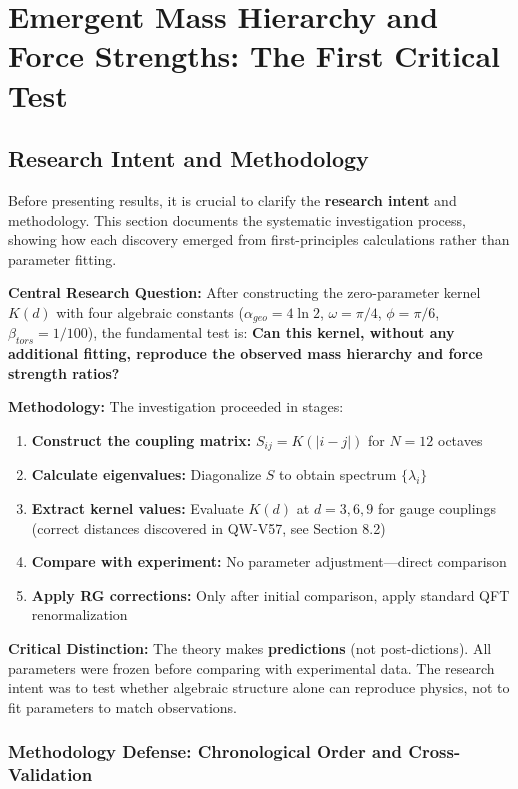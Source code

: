 \documentclass[11pt, a4paper]{article}
\begin{document}
\section{Emergent Mass Hierarchy and Force Strengths: The First Critical Test}

\subsection{Research Intent and Methodology}

Before presenting results, it is crucial to clarify the \textbf{research intent} and methodology. This section documents the systematic investigation process, showing how each discovery emerged from first-principles calculations rather than parameter fitting.

\textbf{Central Research Question:} After constructing the zero-parameter kernel $K(d)$ with four algebraic constants ($\alpha_{geo} = 4\ln 2$, $\omega = \pi/4$, $\phi = \pi/6$, $\beta_{tors} = 1/100$), the fundamental test is: \textbf{Can this kernel, without any additional fitting, reproduce the observed mass hierarchy and force strength ratios?}

\textbf{Methodology:} The investigation proceeded in stages:
\begin{enumerate}
    \item \textbf{Construct the coupling matrix:} $S_{ij} = K(|i-j|)$ for $N = 12$ octaves
    \item \textbf{Calculate eigenvalues:} Diagonalize $S$ to obtain spectrum $\{\lambda_i\}$
    \item \textbf{Extract kernel values:} Evaluate $K(d)$ at $d = 3, 6, 9$ for gauge couplings (correct distances discovered in QW-V57, see Section 8.2)
    \item \textbf{Compare with experiment:} No parameter adjustment—direct comparison
    \item \textbf{Apply RG corrections:} Only after initial comparison, apply standard QFT renormalization
\end{enumerate}

\textbf{Critical Distinction:} The theory makes \textbf{predictions} (not post-dictions). All parameters were frozen before comparing with experimental data. The research intent was to test whether algebraic structure alone can reproduce physics, not to fit parameters to match observations.

\subsubsection{Methodology Defense: Chronological Order and Cross-Validation}
\end{document}
